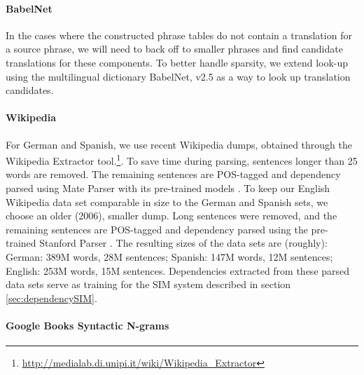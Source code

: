 \documentclass[11pt]{article}
\begin{document}
\paragraph{BabelNet} %

In the cases where the constructed phrase tables do not contain a translation
for a source phrase, we will need to back off to smaller phrases and find
candidate translations for these components.  To better handle sparsity, we
extend look-up using the multilingual dictionary BabelNet, v2.5
\cite{Navigli:Ponzetto:12} as a way to look up translation candidates.

\paragraph{Wikipedia} %


For German and Spanish, we use recent Wikipedia dumps, obtained through the Wikipedia Extractor tool.\footnote{\url{http://medialab.di.unipi.it/wiki/Wikipedia_Extractor}}. To save time during parsing, sentences longer than 25 words are removed. The remaining sentences are POS-tagged and dependency parsed using Mate Parser with its pre-trained models \cite{bohnet:10,bohnet:kuhn:12,seeker:kuhn:13}. To keep our English Wikipedia data set comparable in size to the German and Spanish sets, we choose an older (2006), smaller dump. Long sentences were removed, and the remaining sentences are POS-tagged and dependency parsed using the pre-trained Stanford Parser \cite{klein:manning:03,marneffe:maccartney:ea:06}. The resulting sizes of the data sets are (roughly): German: 389M words, 28M sentences; Spanish: 147M words, 12M sentences; English: 253M words, 15M sentences. Dependencies extracted from these parsed data sets serve as training for the SIM system described in section \ref{sec:dependencySIM}.

\paragraph{Google Books Syntactic N-grams}
\end{document}
